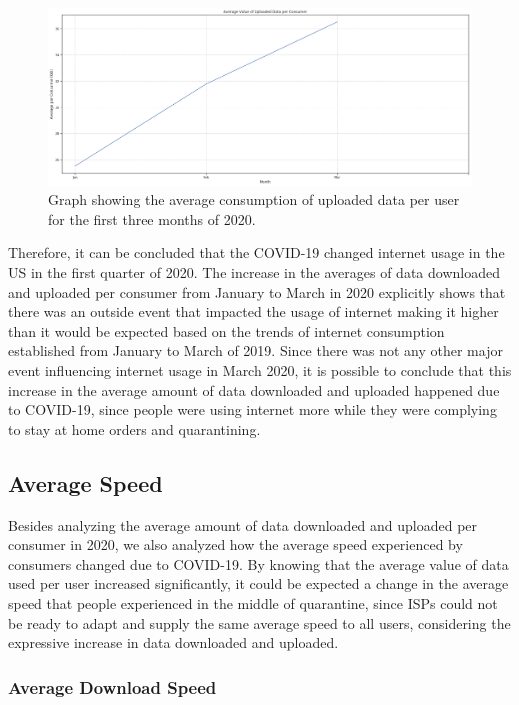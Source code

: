 \documentclass[conference,10pt]{IEEEtran}
\begin{document}
\begin{figure}
\centering
\includegraphics[width=1.0\linewidth]{figs/upload2020.PNG}
\caption{Graph showing the average consumption of uploaded data per user for the first three months of 2020.}
\label{fig:upload2020}
\end{figure}

Therefore, it can be concluded that the COVID-19 changed internet usage in the US in the first quarter of 2020. The increase in the averages of data downloaded and uploaded per consumer from January to March in 2020 explicitly shows that there was an outside event that impacted the usage of internet making it higher than it would be expected based on the trends of internet consumption established from January to March of 2019. Since there was not any other major event influencing internet usage in March 2020, it is possible to conclude that this increase in the average amount of data downloaded and uploaded happened due to COVID-19, since people were using internet more while they were complying to stay at home orders and quarantining.

\subsection{Average Speed}
\label{sec:average-speed}
Besides analyzing the average amount of data downloaded and uploaded per consumer in 2020, we also analyzed how the average speed experienced by consumers changed due to COVID-19. By knowing that the average value of data used per user increased significantly, it could be expected a change in the average speed that people experienced in the middle of quarantine, since ISPs could not be ready to adapt and supply the same average speed to all users, considering the expressive increase in data downloaded and uploaded.

\subsubsection{Average Download Speed}
\label{sec:average-download-speed}
\end{document}
